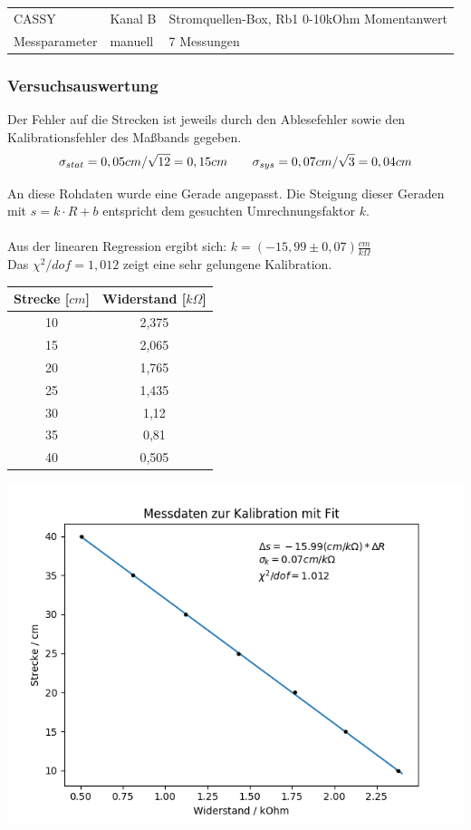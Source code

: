\documentclass[a4paper]{article}
\begin{document}
	\begin{tabular}{l l l}
		
		CASSY & Kanal B & Stromquellen-Box, Rb1 0-10kOhm Momentanwert \\ 
		 
		Messparameter & manuell &  7 Messungen\\ 
		
	\end{tabular} 
	
	\subsubsection{Versuchsauswertung}
	Der Fehler auf die Strecken ist jeweils durch den Ablesefehler sowie den Kalibrationsfehler des Maßbands gegeben.
	\begin{equation}
	\sigma _{stat} = 0,05 cm / \sqrt{12} = 0,15 cm \text{\qquad} \sigma_{sys} = 0,07 cm / \sqrt{3} = 0,04 cm
	\end{equation}

	An diese Rohdaten wurde eine Gerade angepasst. Die Steigung dieser Geraden mit $s=k\cdot R+b$ entspricht dem gesuchten Umrechnungsfaktor $k$.\\\\
	Aus der linearen Regression ergibt sich: $ k = (-15,99 \pm 0,07) \frac{cm}{k\Omega}$\\
	Das $\chi^2/dof = 1,012$ zeigt eine sehr gelungene Kalibration.
	\begin{center}
        \begin{tabular}{|c|c|}
        	\hline
	        \textbf{Strecke [$cm$]} & \textbf{Widerstand [$k\Omega$]} \\
	        \hline
	        10 & 2,375 \\
			\hline
			15 & 2,065 \\
			\hline
			20 & 1,765 \\
			\hline
			25 & 1,435 \\
			\hline
			30 & 1,12 \\
			\hline
			35 & 0,81 \\
			\hline
			40 & 0,505 \\
			\hline		
		\end{tabular}
	\end{center}
	\begin{center}
		\includegraphics[width=0.7\linewidth]{kalibration_poti_fit}
	\end{center}
		
\end{document}
